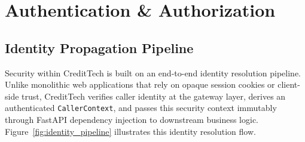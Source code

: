 \chapter{Authentication \& Authorization}
\label{chap:auth}

\section{Identity Propagation Pipeline}
Security within CreditTech is built on an end-to-end identity resolution pipeline. Unlike monolithic web applications that rely on opaque session cookies or client-side trust, CreditTech verifies caller identity at the gateway layer, derives an authenticated \texttt{CallerContext}, and passes this security context immutably through FastAPI dependency injection to downstream business logic. Figure~\ref{fig:identity_pipeline} illustrates this identity resolution flow.

